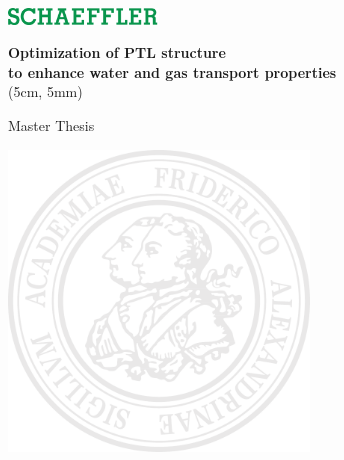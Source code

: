 \begingroup
    \thispagestyle{empty}
    \raggedleft
        \includegraphics[width=4cm]{images/essential/schaeffler.png} \\
    \vspace*{6cm}

    \raggedright 
    \Large
    \textbf{Optimization of PTL structure} \\[6pt]
    \textbf{to enhance water and gas transport properties} \\[18pt]
    \colorbox{schaeffler!80}{\makebox(5cm, 5mm){}} \\
    \vspace*{1.5cm}

    \raggedright
    \Large{Master Thesis} \\
    \raggedleft
    \vspace*{1cm}
    \normalsize

    \vfill

    \begin{minipage}[r]{11cm}
        \raggedleft
        \includegraphics[width=8cm]{images/essential/fausiegel.pdf} \\
    \end{minipage}

    \vspace*{1cm}
    \newpage
    \section*{}
    \thispagestyle{empty}
\endgroup
